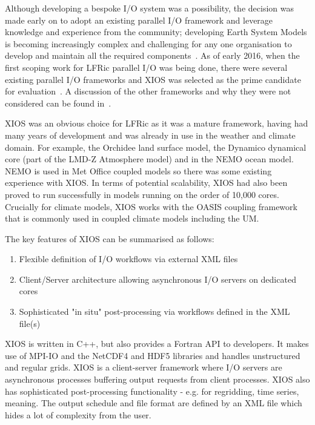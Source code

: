 \documentclass[review,times]{elsarticle}
\begin{document}
Although developing a bespoke I/O system was a possibility, the decision was
made early on to adopt an existing parallel I/O framework and leverage knowledge and
experience from the community; developing Earth System Models is becoming increasingly
complex and challenging for any one organisation to develop and maintain all the required
components~\cite{gmd-2017-186}.
As of early 2016, when the first scoping work for LFRic parallel I/O was being done,
there were several existing parallel I/O frameworks and XIOS was selected as the prime
candidate for evaluation~\cite{XIOSWiki}. A discussion of the other frameworks and why
they were not considered can be found in~\cite{Adams2018}.

XIOS was an obvious choice for LFRic as it was a mature framework, having had many years
of development and was already in use in the weather and climate domain. For example,
the Orchidee land surface model, the Dynamico dynamical core (part of the LMD-Z
Atmosphere model) and in the NEMO ocean model. NEMO is used in Met Office coupled
models so there was some existing experience with XIOS. In terms of potential scalability,
XIOS had also been proved to run successfully in models running on the order of 10,000
cores. Crucially for climate models, XIOS works with the OASIS coupling framework that
is commonly used in coupled climate models including the UM. 

The key features of XIOS can be summarised as follows:
\begin{enumerate}
  \item Flexible definition of I/O workflows via external XML files
  \item Client/Server architecture allowing asynchronous I/O servers on dedicated cores
  \item Sophisticated "in situ" post-processing via workflows defined in the XML file(s) 
\end{enumerate}

XIOS is written in C++, but also provides a Fortran API to developers. It makes use of
MPI-IO and the NetCDF4 and HDF5 libraries and handles unstructured and regular grids.
XIOS is a client-server framework where I/O servers are asynchronous processes buffering
output requests from client processes. XIOS also has sophisticated post-processing
functionality - e.g. for regridding, time series, meaning. The output schedule and
file format are defined by an XML file which hides a lot of complexity from the user.
\end{document}
